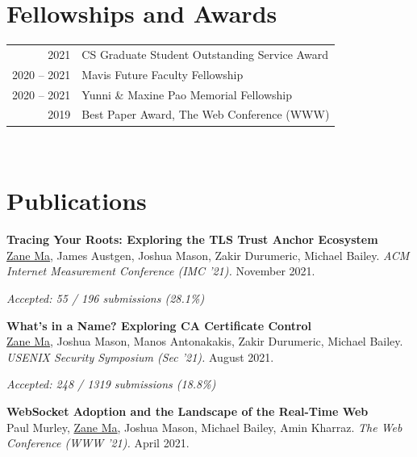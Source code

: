 \documentclass[10pt,singlecolumn]{article} %
\begin{document}
\section{Fellowships and Awards} 

\begin{tabular}{rl}

2021 & CS Graduate Student Outstanding Service Award \\ 

2020 -- 2021 & Mavis Future Faculty Fellowship \\

2020 -- 2021 & Yunni \& Maxine Pao Memorial Fellowship \\

2019 & Best Paper Award, The Web Conference (WWW) \\
\end{tabular}\\

\section{Publications} 


\textbf{Tracing Your Roots: Exploring the TLS Trust Anchor Ecosystem}\\
\underline{Zane Ma}, James Austgen, Joshua Mason, Zakir Durumeric, Michael Bailey.
\textit{ACM Internet Measurement Conference (IMC '21).} November 2021.

{\raggedleft\textit{Accepted: 55 / 196 submissions (28.1\%)}\par}
\vspace{6pt}


\textbf{What's in a Name? Exploring CA Certificate Control}\\
\underline{Zane Ma}, Joshua Mason, Manos Antonakakis, Zakir Durumeric, Michael Bailey.
\textit{USENIX Security Symposium (Sec '21).} August 2021.

{\raggedleft\textit{Accepted: 248 / 1319 submissions (18.8\%)}\par} 
\vspace{6pt}


\textbf{WebSocket Adoption and the Landscape of the Real-Time Web}\\
Paul Murley, \underline{Zane Ma}, Joshua Mason, Michael Bailey, Amin Kharraz.
\textit{The Web Conference (WWW '21).} April 2021.
\end{document}
